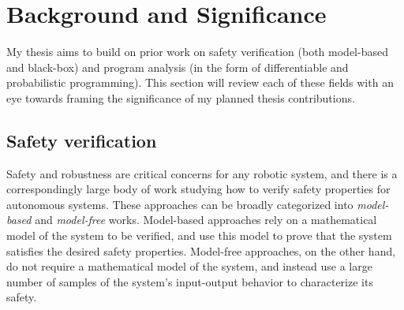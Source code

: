 
\section{Background and Significance}\label{section:lit_review}


My thesis aims to build on prior work on safety verification (both model-based and black-box) and program analysis (in the form of differentiable and probabilistic programming). This section will review each of these fields with an eye towards framing the significance of my planned thesis contributions.

\subsection{Safety verification}



Safety and robustness are critical concerns for any robotic system, and there is a correspondingly large body of work studying how to verify safety properties for autonomous systems. These approaches can be broadly categorized into \textit{model-based} and \textit{model-free} works. Model-based approaches rely on a mathematical model of the system to be verified, and use this model to prove that the system satisfies the desired safety properties. Model-free approaches, on the other hand, do not require a mathematical model of the system, and instead use a large number of samples of the system's input-output behavior to characterize its safety.

